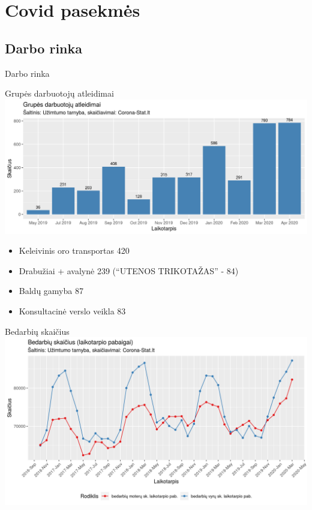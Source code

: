 \documentclass[aspectratio=169, 11pt]{beamer}
\begin{document}
\section{Covid pasekmės}
\subsection{Darbo rinka}

\begin{frame}
\begin{LARGE}
Darbo rinka
\end{LARGE}
\end{frame}

\begin{frame}{Grupės darbuotojų atleidimai}
\centering
\includegraphics[scale=0.5]{grupes_darbuotoju_atleidimai_men_sum.png}
\begin{footnotesize}
\begin{itemize}
\item Keleivinis oro transportas	420
\item Drabužiai + avalynė 239 (“UTENOS TRIKOTAŽAS” - 84)
\item Baldų gamyba	87
\item Konsultacinė verslo veikla	83
\end{itemize}
\end{footnotesize}
\end{frame}


%

\begin{frame}{Bedarbių skaičius}
\centering
\includegraphics[scale=0.575]{bedarbiu_sk.png}
\end{frame}
\end{document}
